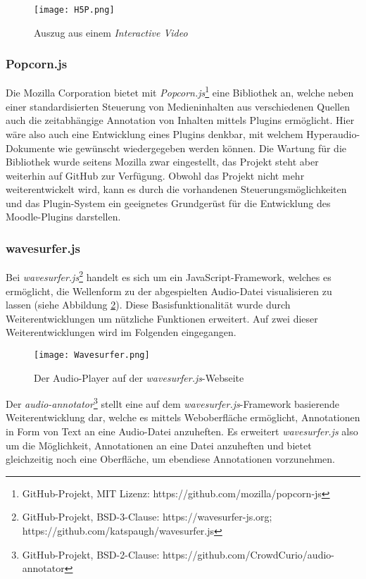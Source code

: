 \begin{figure}[h!]
\texttt{[image: H5P.png]}
\caption{\label{fig:H5P} Auszug aus einem \textit{Interactive Video} \citep{h5p2013video}}
\end{figure}

\subsubsection{Popcorn.js}
Die Mozilla Corporation bietet mit \textit{Popcorn.js}\footnote{GitHub-Projekt, MIT Lizenz: https://github.com/mozilla/popcorn-js} eine Bibliothek an, welche neben einer standardisierten Steuerung von Medieninhalten aus verschiedenen Quellen auch die zeitabhängige Annotation von Inhalten mittels Plugins ermöglicht. Hier wäre also auch eine Entwicklung eines Plugins denkbar, mit welchem Hyperaudio-Dokumente wie gewünscht wiedergegeben werden können. Die Wartung für die Bibliothek wurde seitens Mozilla zwar eingestellt, das Projekt steht aber weiterhin auf GitHub zur Verfügung. Obwohl das Projekt nicht mehr weiterentwickelt wird, kann es durch die vorhandenen Steuerungsmöglichkeiten und das Plugin-System ein geeignetes Grundgerüst für die Entwicklung des Moodle-Plugins darstellen.

 
\subsubsection{wavesurfer.js}
\label{sec:wavesurfer.js}
Bei \textit{wavesurfer.js}\footnote{GitHub-Projekt, BSD-3-Clause: https://wavesurfer-js.org; https://github.com/katspaugh/wavesurfer.js} handelt es sich um ein JavaScript-Framework, welches es ermöglicht, die Wellenform zu der abgespielten Audio-Datei visualisieren zu lassen (siehe Abbildung \ref{fig:Wavesurfer}). Diese Basisfunktionalität wurde durch Weiterentwicklungen um nützliche Funktionen erweitert. Auf zwei dieser Weiterentwicklungen wird im Folgenden eingegangen.

\begin{figure}[h!]
\texttt{[image: Wavesurfer.png]}
\caption{\label{fig:Wavesurfer} Der Audio-Player auf der \textit{wavesurfer.js}-Webseite\citep{wavesurfer}}
\end{figure}


Der \textit{audio-annotator}\footnote{GitHub-Projekt, BSD-2-Clause: https://github.com/CrowdCurio/audio-annotator} stellt eine auf dem \textit{wavesurfer.js}-Framework basierende Weiterentwicklung dar, welche es mittels Weboberfläche ermöglicht, Annotationen in Form von Text an eine Audio-Datei anzuheften. Es erweitert \textit{wavesurfer.js} also um die Möglichkeit, Annotationen an eine Datei anzuheften und bietet gleichzeitig noch eine Oberfläche, um ebendiese Annotationen vorzunehmen.

